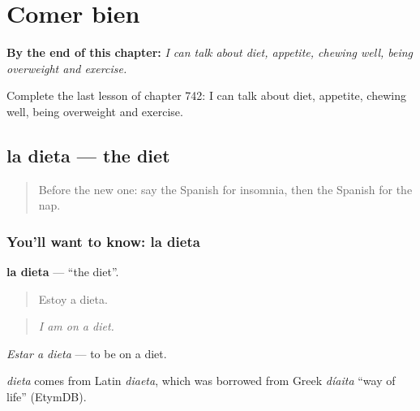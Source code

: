 
\chapter{Comer bien}
\label{ch:es-comer-bien}

\begin{chapteropening}
\textbf{By the end of this chapter:} \emph{I can talk about diet, appetite, chewing well, being overweight and exercise.}

Complete the last lesson of chapter 742: I can talk about diet, appetite, chewing well, being overweight and exercise.
\end{chapteropening}

\section[la dieta]{la dieta — the diet}

\label{lesson:ES-C742-dieta}



\begin{quote}
Before the new one: say the Spanish for insomnia, then the Spanish for the nap.
\end{quote}

\subsection*{You'll want to know: la dieta}
\textbf{la dieta} — \textquotedblleft{}the diet\textquotedblright{}.

\begin{quote}
Estoy a dieta.
\end{quote}

\begin{quote}
\emph{I am on a diet.}
\end{quote}

\emph{Estar a dieta} — to be on a diet.

\begin{cousinweb}
\emph{dieta} comes from Latin \emph{diaeta}, which was borrowed from Greek \emph{díaita} \textquotedblleft{}way of life\textquotedblright{} (EtymDB).
\end{cousinweb}

